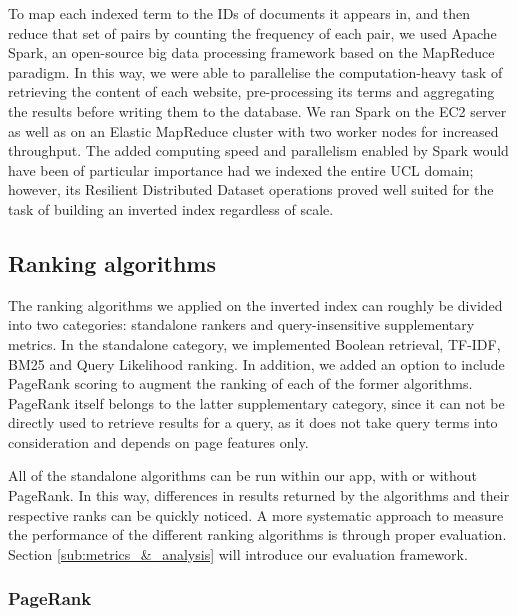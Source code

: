 To map each indexed term to the IDs of documents it appears in, and then reduce that set of pairs by counting the frequency of each pair, we used Apache Spark, an open-source big data processing framework based on the MapReduce paradigm. In this way, we were able to parallelise the computation-heavy task of retrieving the content of each website, pre-processing its terms and aggregating the results before writing them to the database. We ran Spark on the EC2 server as well as on an Elastic MapReduce cluster with two worker nodes for increased throughput. The added computing speed and parallelism enabled by Spark would have been of particular importance had we indexed the entire UCL domain; however, its Resilient Distributed Dataset operations proved well suited for the task of building an inverted index regardless of scale.



\subsection{Ranking algorithms}
\label{sub:ranking}

The ranking algorithms we applied on the inverted index can roughly be divided into two categories: standalone rankers and query-insensitive supplementary metrics. In the standalone category, we implemented Boolean retrieval, TF-IDF, BM25 and Query Likelihood ranking. In addition, we added an option to include PageRank scoring to augment the ranking of each of the former algorithms. PageRank itself belongs to the latter supplementary category, since it can not be directly used to retrieve results for a query, as it does not take query terms into consideration and depends on page features only.

All of the standalone algorithms can be run within our app, with or without PageRank. In this way, differences in results returned by the algorithms and their respective ranks can be quickly noticed. A more systematic approach to measure the performance of the different ranking algorithms is through proper evaluation. Section \ref{sub:metrics_&_analysis} will introduce our evaluation framework.


\subsubsection{PageRank} %
\label{ssub:pagerank}

